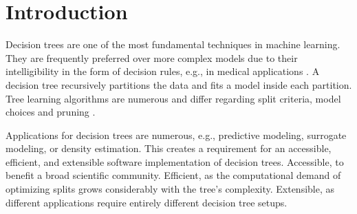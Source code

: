 \documentclass[a4paper, 11pt]{article}
\begin{document}
\section{Introduction}

Decision trees are one of the most fundamental techniques in machine learning. They are frequently preferred over more complex models due to their intelligibility in the form of decision rules, e.g., in medical applications \cite{podgorelec_trees_medicine}. A decision tree recursively partitions the data and fits a model inside each partition. Tree learning algorithms are numerous and differ regarding split criteria, model choices and pruning \cite{loh_trees_review}.
\par

\par
Applications for decision trees are numerous, e.g., predictive modeling, surrogate modeling, or density estimation. This creates a requirement for an accessible, efficient, and extensible software implementation of decision trees. Accessible, to benefit a broad scientific community. Efficient, as the computational demand of optimizing splits grows considerably with the tree's complexity. Extensible, as different applications require entirely different decision tree setups.
\par
\end{document}
